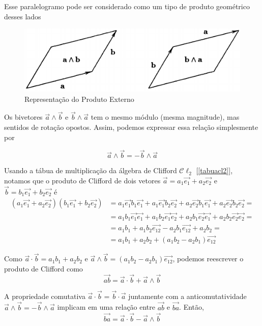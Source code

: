 \documentclass[12pt, oneside, a4paper, english, brazil]{abntex2}
\providecommand{\p}[1]{\left( #1 \right)}
\providecommand{\Cldois}{\mathcal{C}\ell_2}
\renewcommand{\vec}{\overrightarrow}
\theoremstyle{normal}
\theoremstyle{observacao}
\begin{document}
Esse paralelogramo pode ser considerado como um tipo de produto geométrico desses lados

\begin{figure}[h!]
\centering
\includegraphics[scale=0.5]{produtogeometrico}
\caption{Representação do Produto Externo \cite[p. 10]{lounesto2001}}
\label{produtogeometrico}
\end{figure}

Os bivetores $\vec{a} \wedge \vec{b}$ e $\vec{b}\wedge\vec{a}$ tem o mesmo módulo (mesma magnitude), mas sentidos de rotação opostos. Assim, podemos expressar essa relação simplesmente por 

\[
\vec{a} \wedge \vec{b} = -\vec{b}\wedge\vec{a}
\]

Usando a tábua de multiplicação da álgebra de Clifford $\Cldois$ [\ref{tabuacl2}], notamos que o produto de Clifford de dois vetores $\vec{a} = a_1\vec{e_1}+a_2\vec{e_2}$ e $\vec{b} = b_1\vec{e_1}+b_2\vec{e_2}$ é 
\begin{align*}
\p{a_1\vec{e_1}+a_2\vec{e_2}}\p{b_1\vec{e_1}+b_2\vec{e_2}} &= a_1\vec{e_1}b_1\vec{e_1}+a_1\vec{e_1}b_2\vec{e_2}+a_2\vec{e_2}b_1\vec{e_1}+a_2\vec{e_2}b_2\vec{e_2} = \\
&=a_1b_1\vec{e_1}\vec{e_1}+a_1b_2\vec{e_1}\vec{e_2}+a_2b_1\vec{e_2}\vec{e_1}+a_2b_2\vec{e_2}\vec{e_2}=\\
&=a_1b_1+a_1b_2\vec{e_12}-a_2b_1\vec{e_12}+a_2b_2=\\
&=a_1b_1+a_2b_2+\p{a_1b_2-a_2b_1}\vec{e_{12}}
\end{align*}

Como $\vec{a} \cdot \vec{b} = a_1b_1+a_2b_2$ e $\vec{a} \wedge \vec{b} = \p{a_1b_2-a_2b_1}\vec{e_{12}}$, podemos reescrever o produto de Clifford como 
\begin{equation}
\vec{ab} = \vec{a} \cdot \vec{b} + \vec{a} \wedge \vec{b} \label{abproduto}
\end{equation}

A propriedade comutativa $\vec{a} \cdot \vec{b} = \vec{b} \cdot \vec{a}$ juntamente com a anticomutatividade $\vec{a} \wedge \vec{b} = -\vec{b} \wedge\vec{a}$ implicam em uma relação entre $\vec{ab}$ e $\vec{ba}$. Então,
\begin{equation}
\vec{ba} = \vec{a} \cdot \vec{b} - \vec{a} \wedge \vec{b} \label{baproduto}
\end{equation}
\end{document}
